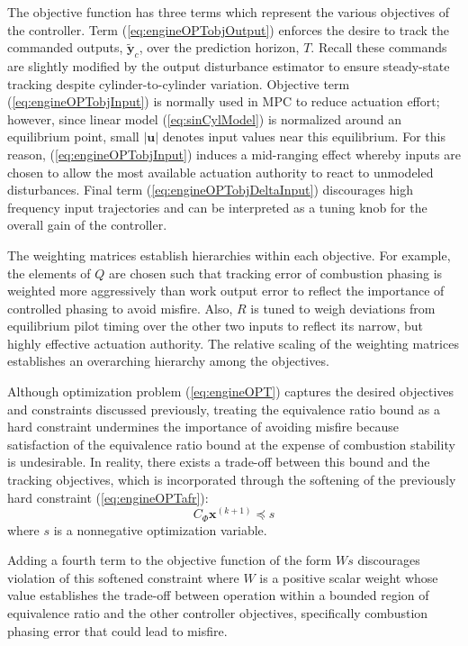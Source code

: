 The objective function has three terms which represent the various objectives of the controller. Term (\ref{eq:engineOPTobjOutput}) enforces the desire to track the commanded outputs, $\mathbf{\tilde{y}}_c$, over the prediction horizon, $T$. Recall these commands are slightly modified by the output disturbance estimator to ensure steady-state tracking despite cylinder-to-cylinder variation. Objective term (\ref{eq:engineOPTobjInput}) is normally used in MPC to reduce actuation effort; however, since linear model (\ref{eq:sinCylModel}) is normalized around an equilibrium point, small $\left|\mathbf{u}\right|$ denotes input values near this equilibrium. For this reason, (\ref{eq:engineOPTobjInput}) induces a mid-ranging effect whereby inputs are chosen to allow the most available actuation authority to react to unmodeled disturbances. Final term (\ref{eq:engineOPTobjDeltaInput}) discourages high frequency input trajectories and can be interpreted as a tuning knob for the overall gain of the controller.

The weighting matrices establish hierarchies within each objective. For example, the elements of $Q$ are chosen such that tracking error of combustion phasing is weighted more aggressively than work output error to reflect the importance of controlled phasing to avoid misfire. Also, $R$ is tuned to weigh deviations from equilibrium pilot timing over the other two inputs to reflect its narrow, but highly effective actuation authority. The relative scaling of the weighting matrices establishes an overarching hierarchy among the objectives.

Although optimization problem (\ref{eq:engineOPT}) captures the desired objectives and constraints discussed previously, treating the equivalence ratio bound as a hard constraint undermines the importance of avoiding misfire because satisfaction of the equivalence ratio bound at the expense of combustion stability is undesirable. In reality, there exists a trade-off between this bound and the tracking objectives, which is incorporated through the softening of the previously hard constraint (\ref{eq:engineOPTafr}):
\begin{equation}
    C_{\Phi} \mathbf{x}^{(k+1)} \preceq s
\end{equation}
where $s$ is a nonnegative optimization variable.

Adding a fourth term to the objective function of the form $Ws$ discourages violation of this softened constraint where $W$ is a positive scalar weight whose value establishes the trade-off between operation within a bounded region of equivalence ratio and the other controller objectives, specifically combustion phasing error that could lead to misfire.

